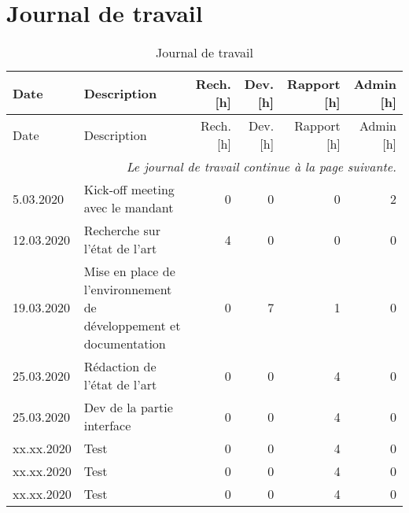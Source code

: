 \chapter{Journal de travail}

\begin{landscape}

\begin{longtable}[c]{lp{10cm}rrrr}
    \caption{Journal de travail}\\

    \hline
    Date & Description & Rech. [h] & Dev. [h] & Rapport [h] & Admin [h] \\
    \hline
    \endfirsthead
    
    \hline
    Date & Description & Rech. [h] & Dev. [h] & Rapport [h] & Admin [h] \\
    \hline
    \endhead
    
    \multicolumn{6}{r}{\small \it Le journal de travail continue à la page suivante.} \\
    \normalsize
    \endfoot
    
    \hline
    \endlastfoot


	5.03.2020 
	& Kick-off meeting avec le mandant \lipsum[1-1]
	& 0 %
	& 0 %
	& 0 %
	& 2\\ %

	12.03.2020 
	& Recherche sur l'état de l'art
	& 4 %
	& 0 %
	& 0 %
	& 0\\ %

	19.03.2020 
	& Mise en place de l'environnement de développement et documentation
	& 0 %
	& 7 %
	& 1 %
	& 0\\ %

	25.03.2020 
	& Rédaction de l'état de l'art
	& 0 %
	& 0 %
	& 4 %
	& 0\\ %

	25.03.2020 
	& Dev de la partie interface
	& 0 %
	& 0 %
	& 4 %
	& 0\\ %
	
	
	xx.xx.2020 
	& Test
	& 0 %
	& 0 %
	& 4 %
	& 0\\ %
	
	xx.xx.2020 
	& Test
	& 0 %
	& 0 %
	& 4 %
	& 0\\ %

	xx.xx.2020 
	& Test
	& 0 %
	& 0 %
	& 4 %
	& 0\\ %


\end{longtable}
\end{landscape}
